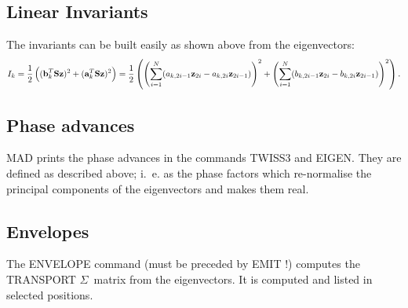 \subsection{Linear Invariants}
The invariants can be built easily as shown above from the
eigenvectors:
\begin{equation}
I_k = \frac{1}{2} \left(
        (\bold{b}_k^T \bold{S} \bold{z})^2 +
        (\bold{a}_k^T \bold{S} \bold{z})^2
\right) = \frac{1}{2}\left(
        \left(
                \sum_{i=1}^N (a_{k,2i-1} \bold{z}_{2i} -
                a_{k,2i} \bold{z}_{2i-1})
        \right)^2 + \left(
                \sum_{i=1}^N (b_{k,2i-1} \bold{z}_{2i} -
                b_{k,2i} \bold{z}_{2i-1})
        \right)^2
\right).
\end{equation} 
 
\subsection{Phase advances}
MAD prints the phase advances in the commands TWISS3 and EIGEN.
They are defined as described above;
i.~e. as the phase factors which re-normalise the principal components
of the eigenvectors and makes them real.
 
\subsection{Envelopes}
\label{EMENGO}
The ENVELOPE command (must be preceded by EMIT !) computes the
TRANSPORT $\Sigma$~matrix from the eigenvectors.
It is computed and listed in selected positions.
 
